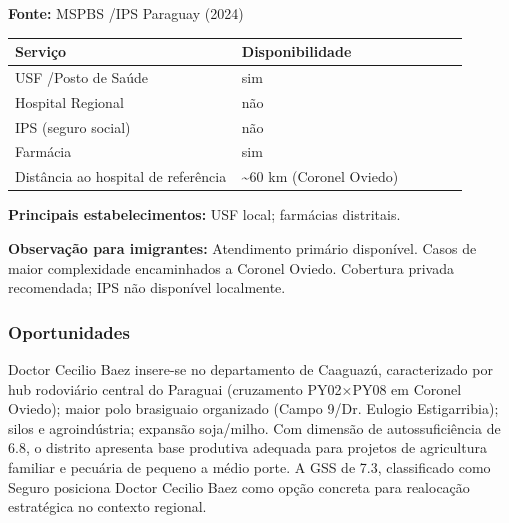 \textbf{Fonte:} MSPBS /\allowbreak  IPS Paraguay (2024)

{\def\LTcaptype{none} %
\begin{longtable}{@{}>{\raggedright\arraybackslash}p{0.45\linewidth} >{\raggedright\arraybackslash}p{0.45\linewidth}@{}}
\toprule\noalign{}
Serviço & Disponibilidade \\
\midrule\noalign{}
\endhead
\bottomrule\noalign{}
\endlastfoot
USF /\allowbreak  Posto de Saúde & sim \\
Hospital Regional & não \\
IPS (seguro social) & não \\
Farmácia & sim \\
Distância ao hospital de referência & \textasciitilde60 km (Coronel
Oviedo) \\
\end{longtable}
}

\textbf{Principais estabelecimentos:} USF local; farmácias distritais.

\textbf{Observação para imigrantes:} Atendimento primário disponível.
Casos de maior complexidade encaminhados a Coronel Oviedo. Cobertura
privada recomendada; IPS não disponível localmente.
\newpage

\subsubsection*{Oportunidades}\label{oport-doctor-cecilio-baez-0504}
Doctor Cecilio Baez insere-se no departamento de Caaguazú, caracterizado por hub rodoviário central do Paraguai (cruzamento PY02×PY08 em Coronel Oviedo); maior polo brasiguaio organizado (Campo 9/Dr. Eulogio Estigarribia); silos e agroindústria; expansão soja/milho. Com dimensão de autossuficiência de 6.8, o distrito apresenta base produtiva adequada para projetos de agricultura familiar e pecuária de pequeno a médio porte. A GSS de 7.3, classificado como Seguro posiciona Doctor Cecilio Baez como opção concreta para realocação estratégica no contexto regional.

